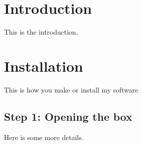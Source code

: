 \hypertarget{index_intro_sec}{}\section{Introduction}\label{index_intro_sec}
This is the introduction.\hypertarget{index_install_sec}{}\section{Installation}\label{index_install_sec}
This is how you make or install my software\hypertarget{index_step1}{}\subsection{Step 1\-: Opening the box}\label{index_step1}
Here is some more details. 